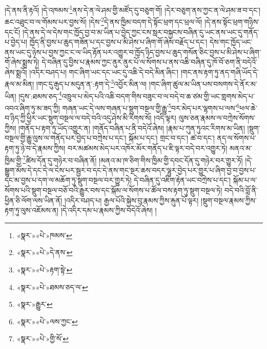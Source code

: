 །དེ་ནས་ནི་རྟའོ། །དེ་འཁམས་\footnote{«སྣར་»«པེ་»ཁམས་}ནས་དེ་ན་ལེ་ཤམ་གྱི་མཛོད་དུ་བཅུག་གོ། །དེར་བཅུག་ནས་ཀྱང་ན་ལེ་ཤམ་ཟ་བ་དང་། ཆང་འཐུང་བ་ལ་གོམས་པར་བྱས་སོ། །དེས་\footnote{«སྣར་»«པེ་»དེ་ནས་}དེ་ནས་ཁྱིམ་བདག་དེ་སྟོང་ཕྲག་དང་ཕྲལ་ལོ། །དེ་ནས་སྟོང་ཕྲག་གཉིས་དང་ངོ། །དེ་ནས་དེ་ལ་དེས་གང་ཁྱོད་བྱ་བ་མ་ཡིན་པ་བྱེད་ཀྱང་ངས་སླར་བསྐྱངས་བཞིན་དུ་ཡང་ནས་ཡང་དུ་གནོད་པ་བྱེད་པ། ཁྱོད་ནི་བྱས་པ་ཆུད་གཟོན་པ་དང་བྱས་པ་མི་ཤེས་པ་ཞིག་གོ་ཞེས་བརྗོད་པ་དང་། དེས་གང་ཁྱོད་ཡང་ནས་ཡང་དུ་ཉེས་པ་བྱས་ཀྱང་ང་ལ་ཡིད་རྟོན་པར་འགྱུར་བ་ཁྱོད་ཉིད་བྱས་པ་ཆུད་གསོན་ཅིང་བྱས་པ་མི་ཤེས་པ་ཞིག་གོ་ཞེས་སྨྲས་ཏེ། དེ་བཞིན་དུ་བྱིས་པ་རྣམས་ཀྱང་ནུར་ནུར་པོ་ལ་སོགས་པ་ནས་འཆི་བཞིན་དུ་ཁོ་བོ་ཅག་ནི་བདེའོ་ཞེས་སྨྲའོ། །འདིར་བཤད་པ། གང་ཞིག་ཡང་དང་ཡང་དུ་འཆི་དེ་བདེ་མིན་ཞིང་། །གང་ནས་རྟག་ཏུ་ནད་གཞི་ཡོད་དེ་རྣལ་མ་མིན། །གང་དུ་རྒུད་པ་མདུན་ན་:རྟག་དེ་\footnote{«སྣར་»«པེ་»རྟག་སྟེ་}འབྱོར་མིན་ལ། །གང་ཞིག་ཚུལ་མ་ཡིན་པས་བསགས་དེ་ནོར་མ་ཡིན། །དུས་:ཐམས་ཅད་\footnote{«སྣར་»«པེ་»ཐམས་ཅད་ལ་}འཁྲུལ་པ་མེད་པའི་འཆི་བདག་གིས་བཟུང་བ་ལ་བདེ་བ་ཆ་ཙམ་གྱི་ཡང་གླགས་མེད་པ་འབའ་ཞིག་ཏུ་མ་ཟད་ཀྱི། གཞན་ཡང་དེ་ལས་གཞན་པ་སྡུག་བསྔལ་གྱི་རྒྱུ་\footnote{«སྣར་»རྒྱུར་}བར་མེད་པར་ལྷགས་པ་ལས་\footnote{«སྣར་»«པེ་»ལས་ཀྱང་}ཕལ་ཆེ་བ་ཉིད་ཀྱི་ཕྱིར་ཡང་སྡུག་བསྔལ་ལ་བདེ་བའི་འདུ་ཤེས་མི་རིགས་སོ། །འདི་ལྟར། ལུས་ཅན་རྣམས་ལ་བཀྲེས་སོགས་ཀྱིས། །གནོད་པ་རྟག་ཏུ་ཡོད་འགྱུར་ན། །གནོད་བཞིན་པ་ནི་བདེའོ་ཞེས། །རྣམ་པ་ཀུན་ཏུའང་རིགས་མ་ཡིན། །སྡུག་བསྔལ་གྱི་རྒྱུ་ལུས་ལ་གནོད་པར་བྱེད་པ་བཀྲེས་པ་དང་། སྐོམ་པ་དང་། གྲང་བ་དང་། ཚ་བ་དང་། ནད་ལ་སོགས་པ་རྟག་ཏུ་ཉེ་བ་དེ་རྣམས་ཀྱིས། བར་མཚམས་མེད་པར་འཁོར་མོར་གནོད་པ་ཇི་ལྟར་བདེ་བར་འགྱུར་ཏེ། མནའ་མ་ཁྱིམ་གྱི་\footnote{«སྣར་»«པེ་»གྱི་སོ་}ཚིས་དོན་དུ་གཉེར་བ་བཞིན་ནོ། །མནའ་མ་ཁ་ཅིག་གིས་ཁྱིམ་གྱི་དབང་དོན་དུ་གཉེར་བར་གྱུར་ཏོ། །དེ་སྒྱུག་མོས་དེ་དང་དེ་ལ་ངེས་པར་སྦྱར་བ་དང་དེ་ནས་གང་སྔར་ཆས་བདར་ལྷུར་བྱེད་པར་གྱུར་པ་ཞིག་བྱ་བ་བྱས་པ་དང་མ་བྱས་པ་དག་ལ་མཆོག་ཏུ་སྡུག་བསྔལ་བར་གྱུར་ཏེ། དེ་བཞིན་དུ་འཇིག་རྟེན་ཡང་བཀྲེས་པ་དང་། སྐོམ་པ་ལ་སོགས་པའི་སྡུག་བསྔལ་བཅོ་བའི་རྒྱུར་བས་དང་སྐོམ་ལ་སོགས་པ་ཚོལ་བས་རྟག་ཏུ་སྡུག་བསྔལ་ཏེ། བདེ་བའི་བློ་ནི་ཕྱིན་ཅི་ལོག་ལས་ཡིན་ནོ། །འདིར་བཤད་པ། རྒྱལ་པོའི་སྐྱེས་བུ་རྣམས་ཀྱིས་རྐུན་པོ་ལྟར། །སྡུག་བསྔལ་རྣམས་ཀྱིས་རྟག་ཏུ་ལུས་འཇོམས་ན། །དེ་འདིར་དམ་པ་རྣམས་ཀྱིས་བདེའོ་ཞེས། །
